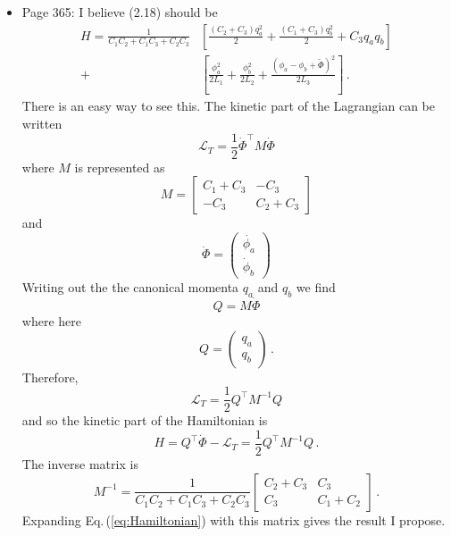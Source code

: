 \documentclass{article}
\begin{document}
\begin{itemize}

\item Page 365: I believe (2.18) should be
\begin{align}
H = \frac{1}{C_1 C_2 + C_1 C_3 + C_2 C_3} & \left[
\frac{(C_2 + C_3) q_a^2}{2}
+ \frac{(C_1 + C_3)q_b^2}{2}
+ C_3 q_a q_b \right] \nonumber \\
+ & \left[
\frac{\phi_a^2}{2 L_1} + \frac{\phi_b^2}{2 L_2} + \frac{(\phi_a - \phi_b + \tilde{\Phi})^2}{2 L_3} \right] \nonumber \, .
\end{align}
There is an easy way to see this.
The kinetic part of the Lagrangian can be written
\begin{equation}
\mathcal{L}_{T} = \frac{1}{2} \dot{\Phi}^\top M \dot{\Phi}
\end{equation}
where $M$ is represented as
\begin{equation}
M = \left[ \begin{array} {cc} C_1 + C_3 & -C_3 \\ -C_3 & C_2 + C_3 \end{array} \right]
\end{equation}
and
\begin{equation}
\dot{\Phi} = \left( \begin{array}{c} \dot{\phi_a} \\ \dot{\phi}_b \end{array} \right)
\end{equation}
Writing out the the canonical momenta $q_a$ and $q_b$ we find
\begin{equation}
Q = M \dot{\Phi}
\end{equation}
where here
\begin{equation}
Q = \left( \begin{array}{c} q_a \\ q_b \end{array} \right) \, .
\end{equation}
Therefore,
\begin{equation}
\mathcal{L}_T = \frac{1}{2} Q^\top M^{-1} Q
\end{equation}
and so the kinetic part of the Hamiltonian is
\begin{equation}
H = Q^\top \dot{\Phi} - \mathcal{L}_T = \frac{1}{2} Q^\top M^{-1} Q \label{eq:Hamiltonian} \, .
\end{equation}
The inverse matrix is
\begin{equation}
M^{-1} = \frac{1}{C_1 C_2 + C_1 C_3 + C_2 C_3}
\left[ \begin{array}{cc} C_2 + C_3  & C_3 \\ C_3 & C_1 + C_2 \end{array} \right] \, .
\end{equation}
Expanding Eq.\,(\ref{eq:Hamiltonian}) with this matrix gives the result I propose.


\end{itemize}
\end{document}
